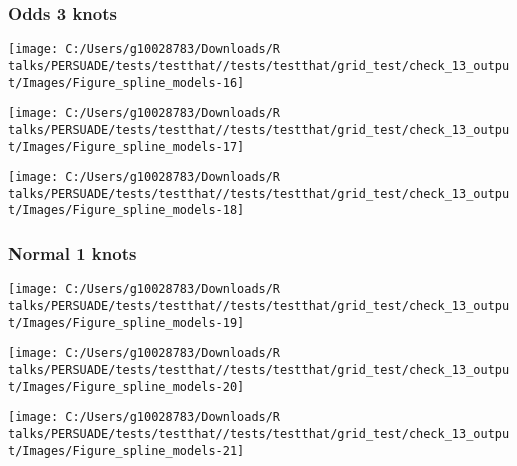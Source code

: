 \documentclass[
]{article}
\begin{document}
\clearpage

\subsubsection{Odds 3 knots}\label{odds-3-knots}

\begin{flushleft}\texttt{[image: C:/Users/g10028783/Downloads/R talks/PERSUADE/tests/testthat//tests/testthat/grid\_test/check\_13\_output/Images/Figure\_spline\_models-16]} \end{flushleft}

\begin{flushleft}\texttt{[image: C:/Users/g10028783/Downloads/R talks/PERSUADE/tests/testthat//tests/testthat/grid\_test/check\_13\_output/Images/Figure\_spline\_models-17]} \end{flushleft}

\begin{flushleft}\texttt{[image: C:/Users/g10028783/Downloads/R talks/PERSUADE/tests/testthat//tests/testthat/grid\_test/check\_13\_output/Images/Figure\_spline\_models-18]} \end{flushleft}

\clearpage

\subsubsection{Normal 1 knots}\label{normal-1-knots}

\begin{flushleft}\texttt{[image: C:/Users/g10028783/Downloads/R talks/PERSUADE/tests/testthat//tests/testthat/grid\_test/check\_13\_output/Images/Figure\_spline\_models-19]} \end{flushleft}

\begin{flushleft}\texttt{[image: C:/Users/g10028783/Downloads/R talks/PERSUADE/tests/testthat//tests/testthat/grid\_test/check\_13\_output/Images/Figure\_spline\_models-20]} \end{flushleft}

\begin{flushleft}\texttt{[image: C:/Users/g10028783/Downloads/R talks/PERSUADE/tests/testthat//tests/testthat/grid\_test/check\_13\_output/Images/Figure\_spline\_models-21]} \end{flushleft}

\clearpage
\end{document}
